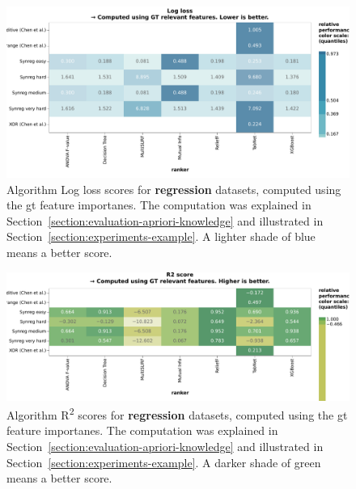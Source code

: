 \documentclass[../main.tex]{subfiles}
\begin{document}
\begin{figure}[ht]
    \centering
    \includegraphics[width=\linewidth]{report/images/results-all-datasets-log-loss-regression.pdf}
    \caption{Algorithm Log loss scores for \textbf{regression} datasets, computed using the \gls{gt} feature importanes. The computation was explained in Section~\ref{section:evaluation-apriori-knowledge} and illustrated in Section~\ref{section:experiments-example}. A lighter shade of blue means a better score.}
    \label{fig:results-all-datasets-log-loss-regression}
\end{figure}

\begin{figure}[ht]
    \centering
    \includegraphics[width=\linewidth]{report/images/results-all-datasets-r2-score-regression.pdf}
    \caption{Algorithm R\textsuperscript{2} scores for \textbf{regression} datasets, computed using the \gls{gt} feature importanes. The computation was explained in Section~\ref{section:evaluation-apriori-knowledge} and illustrated in Section~\ref{section:experiments-example}. A darker shade of green means a better score.}
    \label{fig:results-all-datasets-r2-score-regression}
\end{figure}


\biblio
\end{document}
